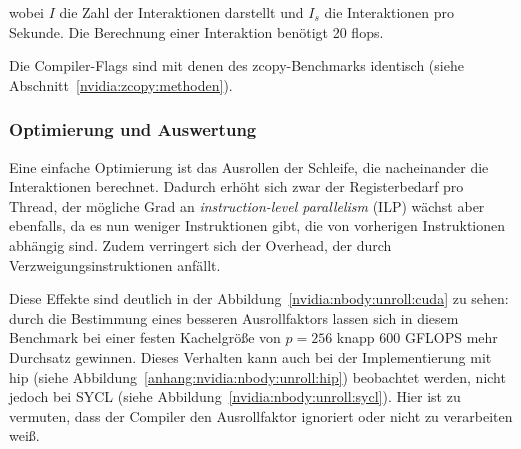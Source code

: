 wobei $I$ die Zahl der Interaktionen darstellt und $I_s$ die Interaktionen pro
Sekunde. Die Berechnung einer Interaktion benötigt 20 \glspl{flop}.

Die Compiler-Flags sind mit denen des zcopy-Benchmarks identisch (siehe
Abschnitt~\ref{nvidia:zcopy:methoden}).

\subsubsection{Optimierung und Auswertung}
\label{nvidia:nbody:auswertung}

Eine einfache Optimierung ist das Ausrollen der Schleife, die nacheinander die
Interaktionen berechnet. Dadurch erhöht sich zwar der Registerbedarf pro Thread,
der mögliche Grad an \textit{instruction-level parallelism} (ILP) wächst aber
ebenfalls, da es nun weniger Instruktionen gibt, die von vorherigen
Instruktionen abhängig sind. Zudem verringert sich der Overhead, der durch
Verzweigungsinstruktionen anfällt.

Diese Effekte sind deutlich in der Abbildung~\ref{nvidia:nbody:unroll:cuda} zu
sehen:  durch die Bestimmung eines besseren Ausrollfaktors lassen sich in diesem
Benchmark bei einer festen Kachelgröße von $p = 256$ knapp \num{600} GFLOPS mehr
Durchsatz gewinnen. Dieses Verhalten kann auch bei der Implementierung mit
\gls{hip} (siehe Abbildung~\ref{anhang:nvidia:nbody:unroll:hip}) beobachtet
werden, nicht jedoch bei SYCL (siehe
Abbildung~\ref{nvidia:nbody:unroll:sycl}). Hier ist zu vermuten, dass der
Compiler den Ausrollfaktor ignoriert oder nicht zu verarbeiten weiß.

